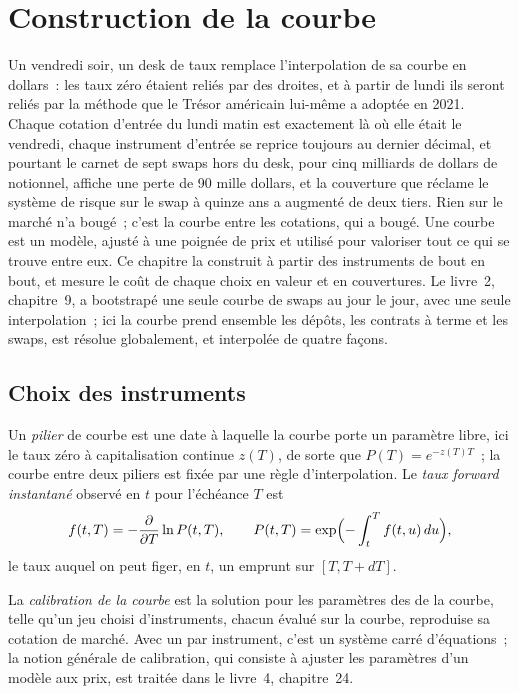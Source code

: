\chapter{Construction de la courbe}\label{ch:rc:curve-construction}

Un vendredi soir, un desk de taux remplace l'interpolation de sa courbe en
dollars~: les taux zéro étaient reliés par des droites, et à partir de lundi ils seront reliés
par la méthode que le Trésor américain lui-même a adoptée en 2021. Chaque
cotation d'entrée du lundi matin est exactement là où elle était le vendredi,
chaque instrument d'entrée se reprice toujours au dernier décimal, et pourtant le carnet
de sept swaps hors  du desk, pour cinq milliards de dollars de notionnel, affiche une perte de
90 mille dollars, et la couverture que réclame le système de risque sur le swap à quinze ans
a augmenté de deux tiers. Rien sur le marché n'a bougé~; c'est la courbe entre
les cotations, qui a bougé. Une courbe est un modèle, ajusté à une poignée de prix et utilisé pour
valoriser tout ce qui se trouve entre eux. Ce chapitre la construit à partir des instruments
de bout en bout, et mesure le coût de chaque choix en valeur et en couvertures. Le
livre~2, chapitre~9, a bootstrapé une seule courbe de swaps au jour le jour, avec
une seule interpolation~; ici la courbe prend ensemble les dépôts, les contrats à terme et les swaps, est
résolue globalement, et interpolée de quatre façons.

\section{Choix des instruments}

\begin{definition}\label{def:rc:curve-construction:pillar}
Un \emph{pilier} de courbe est une date à laquelle la courbe porte un
paramètre libre, ici le taux zéro à capitalisation continue $z(T)$, de sorte que
$P(T)=e^{-z(T)T}$~; la courbe entre deux piliers est fixée par une règle d'interpolation.
Le \emph{taux forward instantané} observé en
$t$ pour l'échéance $T$ est
\[
f(t,T) = -\frac{\partial}{\partial T}\ln P(t,T),
\qquad
P(t,T)=\exp\Bigl(-\int_t^T f(t,u)\,du\Bigr),
\]
le taux auquel on peut figer, en $t$, un emprunt sur $[T, T+dT]$.
\end{definition}

\begin{definition}\label{def:rc:curve-construction:calibration}
La \emph{calibration de la courbe} est la solution pour les paramètres
des  de la courbe, telle qu'un jeu choisi d'instruments, chacun
évalué sur la courbe, reproduise sa cotation de marché. Avec un  par
instrument, c'est un système carré d'équations~; la notion générale de
calibration, qui consiste à ajuster les paramètres d'un modèle aux prix, est traitée dans le
livre~4, chapitre~24.
\end{definition}

